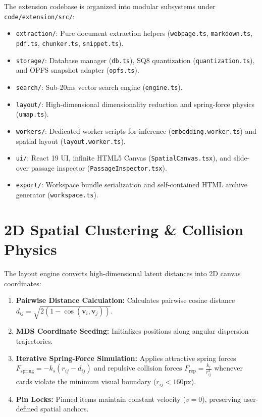 \documentclass{tietreport}
\begin{document}
The extension codebase is organized into modular subsystems under \texttt{code/extension/src/}:
\begin{itemize}
    \item \texttt{extraction/}: Pure document extraction helpers (\texttt{webpage.ts}, \texttt{markdown.ts}, \texttt{pdf.ts}, \texttt{chunker.ts}, \texttt{snippet.ts}).
    \item \texttt{storage/}: Database manager (\texttt{db.ts}), SQ8 quantization (\texttt{quantization.ts}), and OPFS snapshot adapter (\texttt{opfs.ts}).
    \item \texttt{search/}: Sub-20ms vector search engine (\texttt{engine.ts}).
    \item \texttt{layout/}: High-dimensional dimensionality reduction and spring-force physics (\texttt{umap.ts}).
    \item \texttt{workers/}: Dedicated worker scripts for inference (\texttt{embedding.worker.ts}) and spatial layout (\texttt{layout.worker.ts}).
    \item \texttt{ui/}: React 19 UI, infinite HTML5 Canvas (\texttt{SpatialCanvas.tsx}), and slide-over passage inspector (\texttt{PassageInspector.tsx}).
    \item \texttt{export/}: Workspace bundle serialization and self-contained HTML archive generator (\texttt{workspace.ts}).
\end{itemize}

\section{2D Spatial Clustering \& Collision Physics}

The layout engine converts high-dimensional latent distances into 2D canvas coordinates:
\begin{enumerate}
    \item \textbf{Pairwise Distance Calculation:} Calculates pairwise cosine distance $d_{ij} = \sqrt{2(1 - \cos(\mathbf{v}_i, \mathbf{v}_j))}$.
    \item \textbf{MDS Coordinate Seeding:} Initializes positions along angular dispersion trajectories.
    \item \textbf{Iterative Spring-Force Simulation:} Applies attractive spring forces $F_{\text{spring}} = -k_s(r_{ij} - d_{ij})$ and repulsive collision forces $F_{\text{rep}} = \frac{k_r}{r_{ij}^2}$ whenever cards violate the minimum visual boundary ($r_{ij} < 160\text{px}$).
    \item \textbf{Pin Locks:} Pinned items maintain constant velocity ($v = 0$), preserving user-defined spatial anchors.
\end{enumerate}
\end{document}
